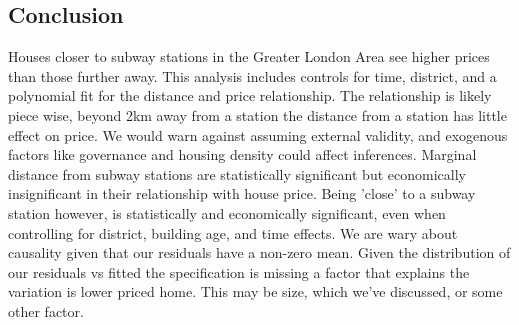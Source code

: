 \subsection{Conclusion}
Houses closer to subway stations in the Greater London Area see higher prices than those further away. 
This analysis includes controls for time, district, and a polynomial fit for the distance and price relationship.
The relationship is likely piece wise, beyond 2km away from a station the distance from a station has little effect on price.
We would warn against assuming external validity, and exogenous factors like governance and housing density could affect inferences. 
Marginal distance from subway stations are statistically significant but economically insignificant in their relationship with house price.
Being 'close' to a subway station however, is statistically and economically significant, even when controlling for district, building age,
 and time effects. We are wary about causality given that our residuals have a non-zero mean. Given the 
 distribution of our residuals vs fitted the specification is missing a factor that explains the variation is lower priced home. This may be size, which we've discussed,
 or some other factor.